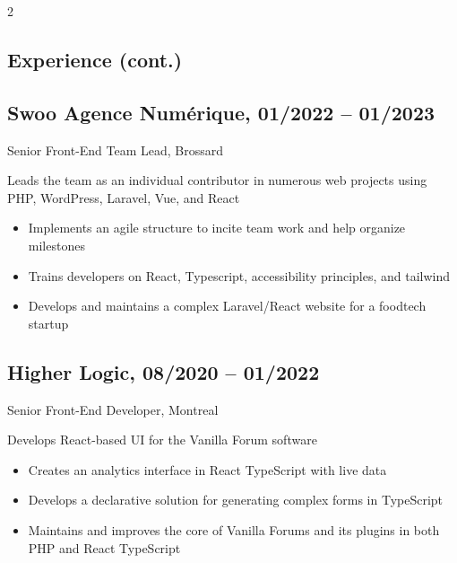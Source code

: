 \documentclass{article}
\begin{document}
\begin{paracol}{2}
\begin{rightcolumn}
    \newpage
    \section{Experience (cont.)}

    \subsection{Swoo Agence Numérique, 01/2022 -- 01/2023}
    {Senior Front-End Team Lead, Brossard\par}
    {
      Leads the team as an individual contributor in numerous web projects using PHP, WordPress, Laravel, Vue, and React
    \par}
    \begin{itemize}
      \item Implements an agile structure to incite team work and help organize milestones
      \item Trains developers on React, Typescript, accessibility principles, and tailwind
      \item Develops and maintains a complex Laravel/React website for a foodtech startup
    \end{itemize}

    \vspace{1em}

    \subsection{Higher Logic, 08/2020 -- 01/2022}
    {Senior Front-End Developer, Montreal\par}
    {
      Develops React-based UI for the Vanilla Forum software
    \par}
    \begin{itemize}
      \item Creates an analytics interface in React TypeScript with live data
      \item Develops a declarative solution for generating complex forms in TypeScript
      \item Maintains and improves the core of Vanilla Forums and its plugins in both PHP and React TypeScript
    \end{itemize}

    \vspace{1em}


\end{rightcolumn}
\end{paracol}
\end{document}
